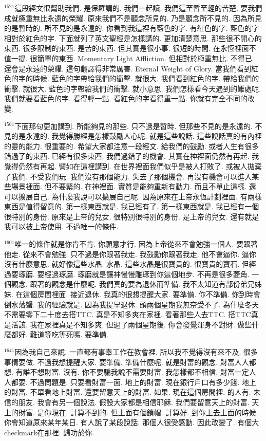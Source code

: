 \documentclass{book}
\begin{document}
$^{1521}$這段經文很幫助我們.
是保羅講的.
我們一起讀.
我們這至暫至輕的苦楚.
要我們成就極重無比永遠的榮耀.
原來我們不是顧念所見的.
乃是顧念所不見的.
因為所見的是暫時的.
所不見的是永遠的.
你看到我這裡有藍色的字.
有紅色的字.
藍色的字相對於紅色的字.
下面就列了英文聖經是怎樣講的.
更加清楚意思.
那些很不開心的東西.
很多限制的東西.
是苦的東西.
但其實是很小事.
很短的時間.
在永恆裡面不值一提.
很簡單的東西.
Momentary Light Affliction.
但相對於極重無比.
不得已.
還會是永遠的榮耀.
這句翻譯得非常厲害.
Eternal Weight of Glory.
當我們看到紅色的字的時候.
藍色的字帶給我們的衝擊.
就很大.
我們看到紅色的字.
帶給我們的衝擊.
就很大.
藍色的字帶給我們的衝擊.
就小意思.
我們怎樣看今天遇到的難處呢.
我們就要看藍色的字.
看得輕一點.
看紅色的字看得重一點.
你就有完全不同的改變.

$^{1561}$下面那句更加講到.
所能夠見的那些.
只不過是暫時.
但那些不見的是永遠的.
不見的是永遠的.
我覺得勝經是怎樣鼓勵人心呢.
就是這些說話.
這些說話真的有內裡的靈的能力.
很重要的.
希望大家都注意一段經文.
給我們的鼓勵.
或者人生有很多錯過了的東西.
已經有很多東西.
我們過錯了的機會.
其實在神裡面仍然有再起.
我覺得仍然有再起.
譬如在這裡講到.
在世界裡面我們似乎是被人打敗了.
或被人拋棄了我們.
不受我們玩.
我們沒有那個能力.
失去了那個機會.
再沒有機會可以進入某些場景裡面.
但不要緊的.
在神裡面.
實質是能夠重新有動力.
而且不單止這樣.
還可以擴展自己.
為什麼我說可以擴展自己呢.
因為原來在上帝永恆計劃裡面.
有兩樣東西是值得留意的.
第一樣東西就是.
我已經有了.
第一樣東西就是.
我已經有一個很特別的身份.
原來是上帝的兒女.
很特別很特別的身份.
是上帝的兒女.
還有就是我可以被上帝使用.
不過唯一的條件.

$^{1601}$唯一的條件就是你肯不肯.
你願意才行.
因為上帝從來不會勉強一個人.
要跟著他走.
從來不會勉強.
只不過是你跟著我走.
我鼓勵你跟著我走.
他不會逼你.
逼你沒有什麼意思.
就好像這些水晶.
水晶.
這些水晶是很寶貴的.
很寶貴的寶石.
但經過要琢磨.
要經過琢磨.
琢磨就是讓神慢慢雕琢到你這個地步.
不再是很多菱角.
一個觀念.
跟著的觀念是什麼呢.
我們真的要為退休而準備.
我不太知道有部份弟兄姊妹.
在這個房間裡面.
接近退休.
我真的很想提醒大家.
要準備.
你不準備.
你到時會倒水落蟹.
我的經驗就是.
因為我提早退休.
頭兩個星期我無奈受不了.
為什麼冬天不需要零下二十度去搭TTC.
真是不知多爽在家裡.
看著那些人去TTC.
搭TTC真是活該.
我在家裡真是不知多爽.
但過了兩個星期後.
你會發覺渾身不對財.
做些什麼都好.
難道等吃等死嗎.
要準備.

$^{1641}$因為我自己來說.
一直都有事奉工作在教會裡.
所以我不覺得沒有來不及.
很多事情要做.
不過我想提醒大家.
要準備.
準備什麼呢.
就是財富的觀念.
財富人人都想.
有誰不想財富.
沒有.
你不要騙我說不需要財富.
我怎樣都不相信.
財富一定人人都要.
不過問題是.
只要看財富一面.
地上的財富.
現在銀行戶口有多少錢.
地上的財富.
不單看地上財富.
還要留意天上的財富.
如果.
現在這個房間裡.
的人有.
未信的朋友.
我會有另一個說法.
假設大家都是相信耶穌.
我們要留意天上的財富.
天上的財富.
是你現在.
計算不到的.
但上面有個鎖帽.
計算好.
到你上去上面的時候.
你會知道原來某年某日.
有人說了某段說話.
那個人很受感動.
因此改變了.
有個大checkmark在那裡.
歸功於你.
\end{document}
